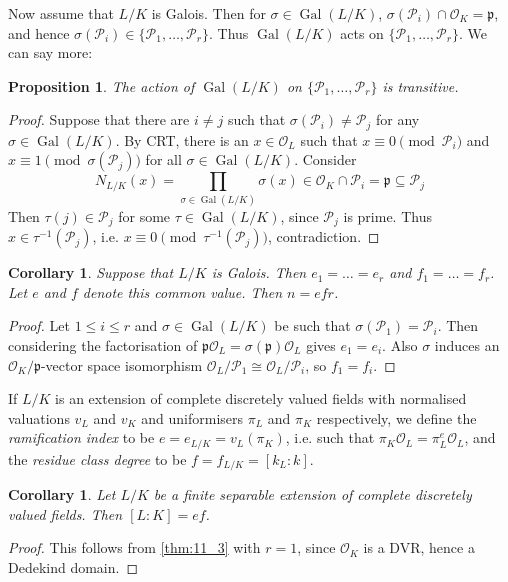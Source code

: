 \documentclass[11pt]{article}
\theoremstyle{definition}
\theoremstyle{plain}
\newtheorem{proposition}[definition]{Proposition}
\newtheorem{corollary}[definition]{Corollary}
\theoremstyle{remark}
\DeclareMathOperator{\Gal}{Gal}
\newcommand{\cO}{\mathcal{O}}
\newcommand{\cP}{\mathcal{P}}
\newcommand{\fp}{\mathfrak{p}}
\begin{document}
Now assume that $L / K$ is Galois. Then for $\sigma \in \Gal(L / K)$, $\sigma(\cP_i) \cap \cO_K = \fp$, and hence $\sigma(\cP_i) \in \{\cP_1, \ldots, \cP_r\}$. Thus $\Gal(L / K)$ acts on $\{\cP_1, \ldots, \cP_r\}$. We can say more:

\begin{proposition}\label{prop:11_4}
    The action of $\Gal(L / K)$ on $\{\cP_1, \ldots, \cP_r\}$ is transitive.
\end{proposition}
\begin{proof}
    Suppose that there are $i \neq j$ such that $\sigma(\cP_i) \neq \cP_j$ for any $\sigma \in \Gal(L / K)$. By CRT, there is an $x \in \cO_L$ such that $x \equiv 0 \pmod{\cP_i}$ and $x \equiv 1 \pmod{\sigma(\cP_j)}$ for all $\sigma \in \Gal(L/K)$. Consider
    \begin{equation*}
        N_{L/K}(x) = \prod_{\sigma \in \Gal(L/K)} \sigma(x) \in \cO_K \cap \cP_i = \fp \subseteq \cP_j
    \end{equation*}
    Then $\tau(j) \in \cP_j$ for some $\tau \in \Gal(L/K)$, since $\cP_j$ is prime. Thus $x \in \tau^{-1}(\cP_j)$, i.e. $x \equiv 0 \pmod{\tau^{-1}(\cP_j)}$, contradiction.
\end{proof}

\begin{corollary}\label{cor:11_5}
    Suppose that $L/K$ is Galois. Then $e_1 = \ldots = e_r$ and $f_1 = \ldots = f_r$. Let $e$ and $f$ denote this common value. Then $n = e f r$.
\end{corollary}
\begin{proof}
    Let $1 \le i \le r$ and $\sigma \in \Gal(L/K)$ be such that $\sigma(\cP_1) = \cP_i$. Then considering the factorisation of $\fp \cO_L = \sigma(\fp) \cO_L$ gives $e_1 = e_i$. Also $\sigma$ induces an $\cO_K / \fp$-vector space isomorphism $\cO_L / \cP_1 \cong \cO_L / \cP_i$, so $f_1 = f_i$.
\end{proof}

If $L / K$ is an extension of complete discretely valued fields with normalised valuations $v_L$ and $v_K$ and uniformisers $\pi_L$ and $\pi_K$ respectively, we define the \emph{ramification index} to be $e = e_{L/K} = v_L(\pi_K)$, i.e. such that $\pi_K \cO_L = \pi_L^e \cO_L$, and the \emph{residue class degree} to be $f = f_{L/K} = [k_L : k]$.

\begin{corollary}\label{cor:11_6}
    Let $L/K$ be a finite separable extension of complete discretely valued fields. Then $[L : K] = e f$.
\end{corollary}
\begin{proof}
    This follows from \autoref{thm:11_3} with $r = 1$, since $\cO_K$ is a DVR, hence a Dedekind domain.
\end{proof}
\end{document}
